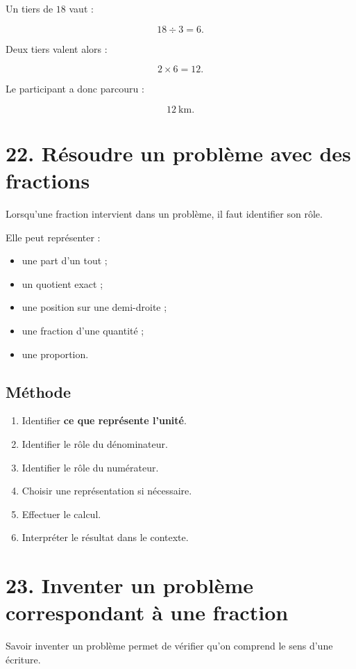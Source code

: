 Un tiers de $18$ vaut :

\[
18\div3=6.
\]

Deux tiers valent alors :

\[
2\times6=12.
\]

Le participant a donc parcouru :

\[
\boxed{12\ \text{km}}.
\]

\section{22. Résoudre un problème avec des fractions}

Lorsqu’une fraction intervient dans un problème, il faut identifier son rôle.

Elle peut représenter :

\begin{itemize}
\item une part d’un tout ;
\item un quotient exact ;
\item une position sur une demi-droite ;
\item une fraction d’une quantité ;
\item une proportion.
\end{itemize}

\subsection{Méthode}

\begin{enumerate}
\item Identifier \textbf{ce que représente l’unité}.
\item Identifier le rôle du dénominateur.
\item Identifier le rôle du numérateur.
\item Choisir une représentation si nécessaire.
\item Effectuer le calcul.
\item Interpréter le résultat dans le contexte.
\end{enumerate}

\section{23. Inventer un problème correspondant à une fraction}

Savoir inventer un problème permet de vérifier qu’on comprend le sens d’une écriture.

